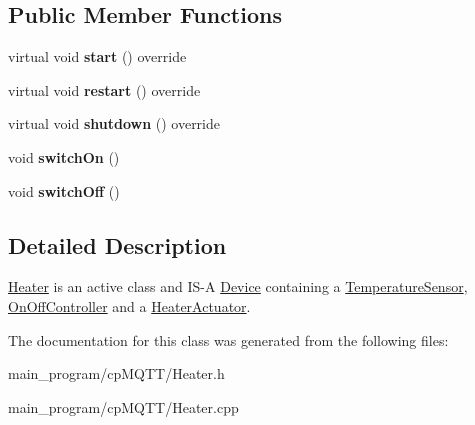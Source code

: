 \subsection*{Public Member Functions}
\begin{DoxyCompactItemize}
\item 
virtual void {\bfseries start} () override\hypertarget{class_heater_a844c1c1893623e61d3ed52d9d6ebb2af}{}\label{class_heater_a844c1c1893623e61d3ed52d9d6ebb2af}

\item 
virtual void {\bfseries restart} () override\hypertarget{class_heater_a93623bfc36c9ac379995ed9cfbdb497b}{}\label{class_heater_a93623bfc36c9ac379995ed9cfbdb497b}

\item 
virtual void {\bfseries shutdown} () override\hypertarget{class_heater_a55b5d8c7e431d8cc7cf5bbc1ac024264}{}\label{class_heater_a55b5d8c7e431d8cc7cf5bbc1ac024264}

\item 
void {\bfseries switch\+On} ()\hypertarget{class_heater_a3ac1d66822cf23b729c5034d6542757a}{}\label{class_heater_a3ac1d66822cf23b729c5034d6542757a}

\item 
void {\bfseries switch\+Off} ()\hypertarget{class_heater_ad08f10b449e1e242784810df1c71689a}{}\label{class_heater_ad08f10b449e1e242784810df1c71689a}

\end{DoxyCompactItemize}


\subsection{Detailed Description}
\hyperlink{class_heater}{Heater} is an active class and I\+S-\/A \hyperlink{class_device}{Device} containing a \hyperlink{class_temperature_sensor}{Temperature\+Sensor}, \hyperlink{class_on_off_controller}{On\+Off\+Controller} and a \hyperlink{class_heater_actuator}{Heater\+Actuator}. 

The documentation for this class was generated from the following files\+:\begin{DoxyCompactItemize}
\item 
main\+\_\+program/cp\+M\+Q\+T\+T/Heater.\+h\item 
main\+\_\+program/cp\+M\+Q\+T\+T/Heater.\+cpp\end{DoxyCompactItemize}
